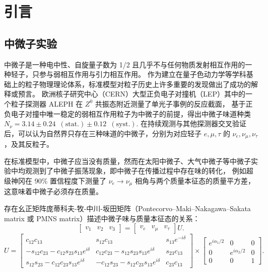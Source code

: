 
\chapter{引言}

\section{中微子实验}
中微子是一种电中性、自旋量子数为 1/2 且几乎不与任何物质发射相互作用的一种轻子，只参与弱相互作用与引力相互作用。
作为建立在量子色动力学等学科基础上的粒子物理理论体系，标准模型对粒子历史上许多重要的发现做出了成功的解释或预言。
欧洲核子研究中心（CERN）大型正负电子对撞机（LEP）其中的一个粒子探测器 ALEPH 在 $Z^0$ 共振态附近测量了单光子事例的反应截面\cite{DECAMP1989519}，
基于正负电子对撞中唯一稳定的弱相互作用粒子为中微子的前提，得出中微子味道种类 $N_\nu=3.14\pm0.24\enspace(\text{stat.})\pm0.12\enspace(\text{syst.})$.
在持续观测与其他探测器交叉验证后，可以认为自然界只存在三种味道的中微子，分别为对应轻子 $e,\mu,\tau$ 的 $\nu_e,\nu_\mu,\nu_\tau$，及其反粒子。

在标准模型中，中微子应当没有质量，然而在太阳中微子、大气中微子等中微子实验中均观测到了中微子振荡现象，即中微子在传播过程中存在味的转化，
例如超级神冈在 90\% 置信程度下测量了 $\nu_e\rightarrow\nu_\mu$ 相角与两个质量本征态的质量平方差\cite{fukudaEvidenceOscillationAtmospheric1998}，
这意味着中微子必须存在质量。

存在幺正矩阵庞蒂科夫-牧-中川-坂田矩阵（Pontecorvo–Maki–Nakagawa–Sakata matrix 或 PMNS matrix）描述中微子味与质量本征态的关系\cite{Cahn2009Aug}：
\begin{equation}
    \begin{bmatrix}
        v_1&v_2&v_3
    \end{bmatrix}
    =
    \begin{bmatrix}
        v_e&v_\mu&v_\tau
    \end{bmatrix}U.
\end{equation}
\begin{equation}\label{eq:PMNS}
    U=
    \begin{bmatrix}
    c_{12}c_{13}&s_{12}c_{13}&s_{13}e^{-i\delta}\\-s_{12}c_{23}-c_{12}s_{23}s_{13}e^{i\delta}&c_{12}c_{23}-s_{12}s_{23}s_{13}e^{i\delta}&s_{23}c_{13}\\s_{12}s_{23}-c_{12}c_{23}s_{13}e^{i\delta}&-c_{12}s_{23}-s_{12}c_{23}s_{13}e^{i\delta}&c_{23}c_{13}
    \end{bmatrix}
    \times 
    \begin{bmatrix}
    e^{i\alpha_1/2}&0&0\\0&e^{i\alpha_2/2}&0\\0&0&1
    \end{bmatrix}.
\end{equation}

